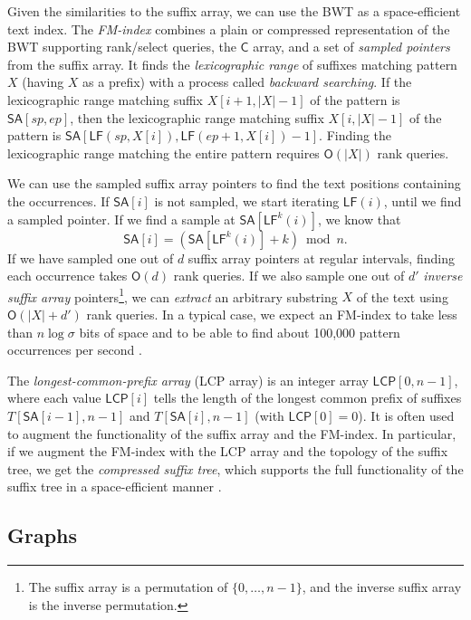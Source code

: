 \documentclass[a4paper,UKenglish]{lipics-v2016}
\newcommand{\set}[1]{\ensuremath{\{ #1 \}}}
\newcommand{\abs}[1]{\ensuremath{\lvert #1 \rvert}}
\newcommand{\Oh}[1]{\ensuremath{\mathsf{O}\!\left( #1 \right)}}
\newcommand{\LF}{\ensuremath{\mathsf{LF}}}
\newcommand{\FMindex}{FM\nobreakdash-index}
\newcommand{\SA}{\ensuremath{\mathsf{SA}}}
\newcommand{\Carray}{\ensuremath{\mathsf{C}}}
\newcommand{\LCP}{\ensuremath{\mathsf{LCP}}}
\begin{document}
Given the similarities to the suffix array, we can use the BWT as a space-efficient text index. The \emph{\FMindex} \cite{Ferragina2005a} combines a plain or compressed representation of the BWT supporting rank/select queries, the $\Carray$ array, and a set of \emph{sampled pointers} from the suffix array. It finds the \emph{lexicographic range} of suffixes matching pattern $X$ (having $X$ as a prefix) with a process called \emph{backward searching}. If the lexicographic range matching suffix $X[i+1, \abs{X}-1]$ of the pattern is $\SA[sp, ep]$, then the lexicographic range matching suffix $X[i, \abs{X}-1]$ of the pattern is $\SA[\LF(sp, X[i]), \LF(ep+1, X[i]) - 1]$. Finding the lexicographic range matching the entire pattern requires $\Oh{\abs{X}}$ rank queries.

We can use the sampled suffix array pointers to find the text positions containing the occurrences. If $\SA[i]$ is not sampled, we start iterating $\LF(i)$, until we find a sampled pointer. If we find a sample at $\SA[\LF^{k}(i)]$, we know that
$$
\SA[i] = (\SA[\LF^{k}(i)] + k) \bmod n.
$$
If we have sampled one out of $d$ suffix array pointers at regular intervals, finding each occurrence takes $\Oh{d}$ rank queries. If we also sample one out of $d'$ \emph{inverse suffix array} pointers\footnote{The suffix array is a permutation of $\set{0, \dotsc, n-1}$, and the inverse suffix array is the inverse permutation.}, we can \emph{extract} an arbitrary substring $X$ of the text using $\Oh{\abs{X}+d'}$ rank queries. In a typical case, we expect an \FMindex{} to take less than $n \log \sigma$ bits of space and to be able to find about 100,000 pattern occurrences per second \cite{Ferragina2009a}.

The \emph{longest-common-prefix array} (LCP array) \cite{Manber1993} is an integer array $\LCP[0, n-1]$, where each value $\LCP[i]$ tells the length of the longest common prefix of suffixes $T[\SA[i-1], n-1]$ and $T[\SA[i], n-1]$ (with $\LCP[0] = 0$). It is often used to augment the functionality of the suffix array and the \FMindex. In particular, if we augment the \FMindex{} with the LCP array and the topology of the suffix tree, we get the \emph{compressed suffix tree}, which supports the full functionality of the suffix tree in a space-efficient manner \cite{Sadakane2007}.

\subsection{Graphs}\label{sect:graphs}
\end{document}
